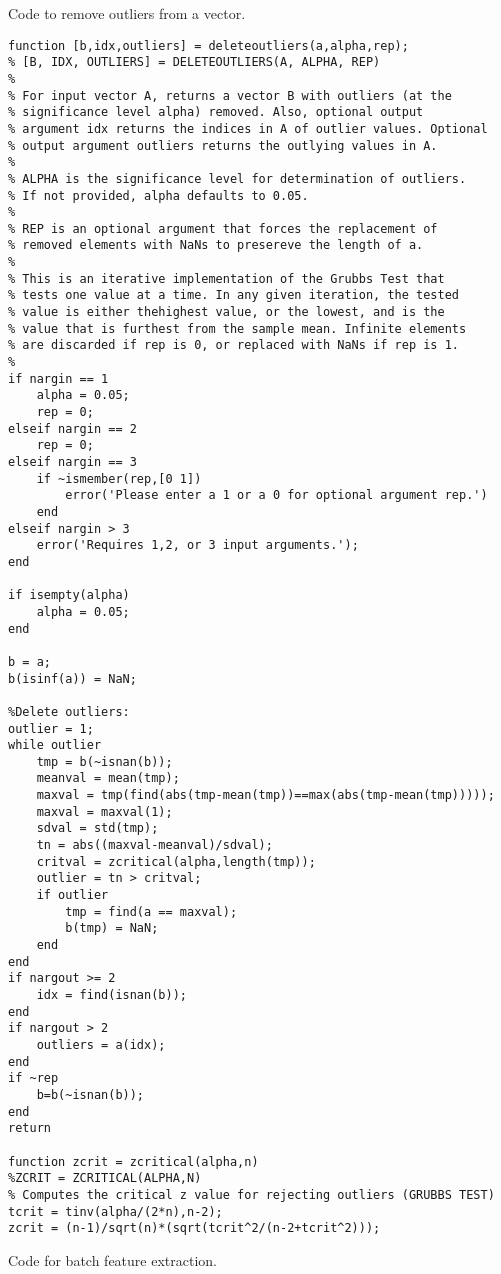\clearpage

Code to remove outliers from a vector.

\begin{verbatim}
function [b,idx,outliers] = deleteoutliers(a,alpha,rep);
% [B, IDX, OUTLIERS] = DELETEOUTLIERS(A, ALPHA, REP)
% 
% For input vector A, returns a vector B with outliers (at the
% significance level alpha) removed. Also, optional output 
% argument idx returns the indices in A of outlier values. Optional
% output argument outliers returns the outlying values in A.
%
% ALPHA is the significance level for determination of outliers.
% If not provided, alpha defaults to 0.05.
% 
% REP is an optional argument that forces the replacement of
% removed elements with NaNs to presereve the length of a.
%
% This is an iterative implementation of the Grubbs Test that
% tests one value at a time. In any given iteration, the tested 
% value is either thehighest value, or the lowest, and is the
% value that is furthest from the sample mean. Infinite elements
% are discarded if rep is 0, or replaced with NaNs if rep is 1.
% 
if nargin == 1
	alpha = 0.05;
	rep = 0;
elseif nargin == 2
	rep = 0;
elseif nargin == 3
	if ~ismember(rep,[0 1])
		error('Please enter a 1 or a 0 for optional argument rep.')
	end
elseif nargin > 3
	error('Requires 1,2, or 3 input arguments.');
end

if isempty(alpha)
	alpha = 0.05;
end

b = a;
b(isinf(a)) = NaN;

%Delete outliers:
outlier = 1;
while outlier
	tmp = b(~isnan(b));
	meanval = mean(tmp);
	maxval = tmp(find(abs(tmp-mean(tmp))==max(abs(tmp-mean(tmp)))));
	maxval = maxval(1);
	sdval = std(tmp);
	tn = abs((maxval-meanval)/sdval);
	critval = zcritical(alpha,length(tmp));
	outlier = tn > critval;
	if outlier
		tmp = find(a == maxval);
		b(tmp) = NaN;
	end
end
if nargout >= 2
	idx = find(isnan(b));
end
if nargout > 2
	outliers = a(idx);
end
if ~rep
	b=b(~isnan(b));
end
return

function zcrit = zcritical(alpha,n)
%ZCRIT = ZCRITICAL(ALPHA,N)
% Computes the critical z value for rejecting outliers (GRUBBS TEST)
tcrit = tinv(alpha/(2*n),n-2);
zcrit = (n-1)/sqrt(n)*(sqrt(tcrit^2/(n-2+tcrit^2)));
\end{verbatim}
\clearpage

Code for batch feature extraction.

